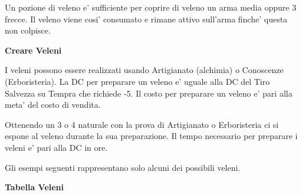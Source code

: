 \documentclass[a4paper,11pt,twoside,openany]{book}
\begin{document}
{		Un pozione di veleno e' sufficiente per coprire di veleno un arma media oppure 3 frecce. Il veleno viene cosi' consumato e rimane attivo sull'arma finche' questa non colpisce.
		
		\textbf{Creare Veleni}
		
		I veleni possono essere realizzati usando Artigianato (alchimia) o Conoscenze (Erboristeria). La DC per preparare un veleno e' uguale alla DC del Tiro Salvezza su Tempra che richiede -5. Il costo per preparare un veleno e' pari alla meta' del costo di vendita.
		
		Ottenendo un 3 o 4 naturale con la prova di Artigianato o Erboristeria ci si espone al veleno durante la sua preparazione. Il tempo necessario per preparare i veleni e' pari alla DC in ore. 
		
		Gli esempi seguenti rappresentano solo alcuni dei possibili veleni.
		\bigskip
		
		\textbf{Tabella Veleni}
		
		\medskip
		
}
\end{document}
